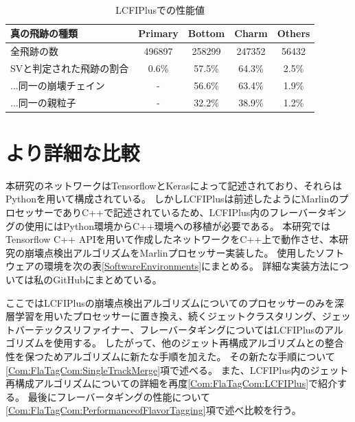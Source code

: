 \begin{table}[htb]
 \centering
　\small
  \begin{tabular}{l c c c c} \hline
    真の飛跡の種類 & Primary & Bottom & Charm & Others\\ \hline
    全飛跡の数 & 496897 & 258299 & 247352 & 56432\\
    SVと判定された飛跡の割合 & 0.6\% & 57.5\% & 64.3\% & 2.5\%\\
    ...同一の崩壊チェイン & - & 56.6\% & 63.4\% & 1.9\%\\
    ...同一の親粒子 & - & 32.2\% & 38.9\% & 1.2\%\\\hline
  \end{tabular}
  \caption{LCFIPlusでの性能値}
  \label{PerformanceofLCFIPlus}
\end{table}


\section{より詳細な比較} \label{Com:FlavorTaggingComparison}

本研究のネットワークはTensorflowとKerasによって記述されており、それらはPythonを用いて構成されている。
しかしLCFIPlusは前述したようにMarlinのプロセッサーでありC++で記述されているため、LCFIPlus内のフレーバータギングの使用にはPython環境からC++環境への移植が必要である。
本研究ではTensorflow C++ APIを用いて作成したネットワークをC++上で動作させ、本研究の崩壊点検出アルゴリズムをMarlinプロセッサー実装した。
使用したソフトウェアの環境を次の表\ref{SoftwareEnvironments}にまとめる。
詳細な実装方法については私のGitHubにまとめている\cite{GitHubGotoKLCFIPlus}。

ここではLCFIPlusの崩壊点検出アルゴリズムについてのプロセッサーのみを深層学習を用いたプロセッサーに置き換え、続くジェットクラスタリング、ジェットバーテックスリファイナー、フレーバータギングについてはLCFIPlusのアルゴリズムを使用する。
したがって、他のジェット再構成アルゴリズムとの整合性を保つためアルゴリズムに新たな手順を加えた。
その新たな手順について\ref{Com:FlaTagCom:SingleTrackMerge}項で述べる。
また、LCFIPlus内のジェット再構成アルゴリズムについての詳細を再度\ref{Com:FlaTagCom:LCFIPlus}で紹介する。
最後にフレーバータギングの性能について\ref{Com:FlaTagCom:PerformanceofFlavorTagging}項で述べ比較を行う。

